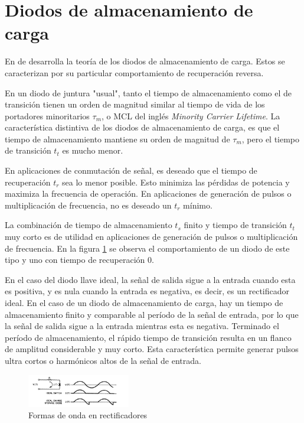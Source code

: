 \section{Diodos de almacenamiento de carga}
\label{sec:charge_storage_diodes}

En \cite{moll1962} de desarrolla la teoría de los diodos de almacenamiento de
carga. Estos se caracterizan por su particular comportamiento de recuperación
reversa.

En un diodo de juntura "usual", tanto el tiempo de almacenamiento como el de
transición tienen un orden de magnitud similar al tiempo de vida de los
portadores minoritarios $\tau_m$, o MCL del inglés \textit{Minority Carrier
Lifetime}. La característica distintiva de los diodos de almacenamiento de
carga, es que el tiempo de almacenamiento mantiene su orden de magnitud de
$\tau_m$, pero el tiempo de transición $t_t$ es mucho menor. \cite{moll1962}

En aplicaciones de conmutación de señal, es deseado que el tiempo de
recuperación $t_r$ sea lo menor posible. Esto minimiza las pérdidas de potencia
y maximiza la frecuencia de operación. En aplicaciones de generación de pulsos o
multiplicación de frecuencia, no es deseado un $t_r$ mínimo.

La combinación de tiempo de almacenamiento $t_s$ finito y tiempo de transición
$t_t$ muy corto es de utilidad en aplicaciones de generación de pulsos o
multiplicación de frecuencia. En la figura
\ref{fig:charge_storage_diode_waveforms} se observa el comportamiento de un
diodo de este tipo y uno con tiempo de recuperación 0.

En el caso del diodo llave ideal, la señal de salida sigue a la entrada cuando
esta es positiva, y es nula cuando la entrada es negativa, es decir, es un
rectificador ideal. En el caso de un diodo de almacenamiento de carga, hay un
tiempo de almacenamiento finito y comparable al período de la señal de entrada,
por lo que la señal de salida sigue a la entrada mientras esta es negativa.
Terminado el período de almacenamiento, el rápido tiempo de transición resulta
en un flanco de amplitud considerable y muy corto. Esta característica permite
generar pulsos ultra cortos o harmónicos altos de la señal de entrada.

\begin{figure}[t]
  \centering
    \includegraphics[width=0.4\textwidth]{images/charge_storage_diode_waveforms.jpg}
    \caption{Formas de onda en rectificadores}
    \label{fig:charge_storage_diode_waveforms}
\end{figure}


